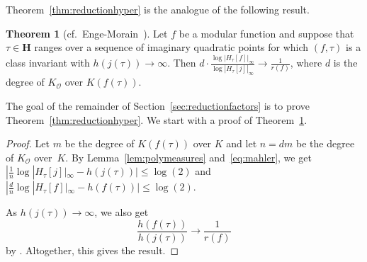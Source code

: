 \documentclass{amsart}
\newcommand{\HH}{\mathbf{H}}
\newcommand{\Fj}{H_\tau[j]}
\newcommand{\Ff}{H_\tau[f]}
\newcommand{\mc}{\mathcal}
\numberwithin{equation}{section}
\theoremstyle{definition}
\newtheorem{theorem}[equation]{Theorem}
\begin{document}
Theorem~\ref{thm:reductionhyper} is the analogue of the following
result.

\begin{theorem}[cf.\ Enge-Morain~\cite{enge-morain2002}]
	\label{thm:reductionx}
	Let $f$ be a modular function and suppose that $\tau\in\HH$ ranges
	over a sequence of imaginary quadratic points for which $(f,\tau)$ is a class
	invariant with $h(j(\tau))\rightarrow \infty$.
	Then
	$d\cdot \frac{\log|\Ff|_\infty}{\log|\Fj|_\infty}\rightarrow \frac{1}{r(f)}$,
	where $d$ is the degree of $K_{\mc{O}}$ over $K(f(\tau))$.
\end{theorem}

The goal of the remainder of Section~\ref{sec:reductionfactors}
is to prove Theorem~\ref{thm:reductionhyper}.
We start with a proof of Theorem~\ref{thm:reductionx}.
\begin{proof}
	Let $m$ be the degree of $K(f(\tau))$ over $K$
	and let $n = dm$ be the degree of $K_{\mc{O}}$ over~$K$.
	By Lemma~\ref{lem:polymeasures} and~\eqref{eq:mahler},
	we get $|\frac{1}{n}\log|\Fj|_\infty - h(j(\tau))|\leq \log(2)$
	and $|\frac{d}{n}\log|\Ff|_\infty - h(f(\tau))| \leq \log(2)$.
	
	As $h(j(\tau))\rightarrow \infty$, we also get
	\begin{equation}\label{eq:limit}
	\frac{h(f(\tau))}{h(j(\tau))} \rightarrow \frac{1}{r(f)}
	\end{equation} by \cite[Proposition B.3.5(b)]{hindry-silverman}.
	Altogether, this gives the result.
\end{proof}

\newcommand{\wase}{{d'}}
\end{document}
